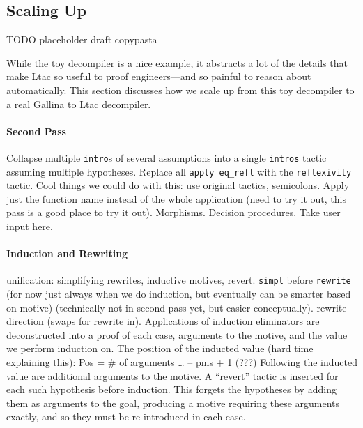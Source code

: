 \subsection{Scaling Up}
\label{sec:second}

TODO placeholder draft copypasta

While the toy decompiler is a nice example, it abstracts a lot of the details that make Ltac so useful to proof engineers---and so painful to 
reason about automatically.
This section discusses how we scale up from this toy decompiler to a real Gallina to Ltac decompiler.

\paragraph{Second Pass}
Collapse multiple \lstinline{intro}s of several assumptions into a single \lstinline{intros} tactic assuming multiple hypotheses.
Replace all \lstinline{apply eq_refl} with the \lstinline{reflexivity} tactic.
Cool things we could do with this: use original tactics, semicolons. Apply just the function name instead of the whole application (need to try it out, this pass is a good place to try it out). Morphisms. Decision procedures.
Take user input here.

\paragraph{Induction and Rewriting}
unification: simplifying rewrites, inductive motives, revert.
\lstinline{simpl} before \lstinline{rewrite} (for now just always when we do induction, but eventually can be smarter based on motive) (technically not
in second pass yet, but easier conceptually).
rewrite direction (swaps for rewrite in).
Applications of induction eliminators are deconstructed into a proof of each case, arguments to the motive, and the value we perform induction on.
The position of the inducted value (hard time explaining this): Pos = \# of arguments … – pms + 1 (???)
Following the inducted value are additional arguments to the motive. A “revert” tactic is inserted for each such hypothesis before induction. This forgets the hypotheses by adding them as arguments to the goal, producing a motive requiring these arguments exactly, and so they must be re-introduced in each case.

